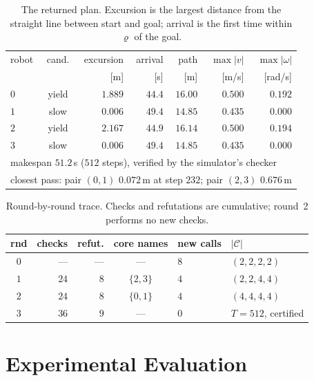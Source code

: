 \documentclass[conference]{IEEEtran}
\theoremstyle{plain}
\theoremstyle{definition}
\newcommand{\Cand}{\mathcal{C}}
\begin{document}
\begin{table}[t]
\caption{The returned plan. Excursion is the largest distance from the straight line between
start and goal; arrival is the first time within $\varrho$ of the goal.}
\label{tab:result}
\centering
\small
\setlength{\tabcolsep}{4pt}
\begin{tabular}{lcrrrrr}
\toprule
robot & cand. & excursion & arrival & path & $\max|v|$ & $\max|\omega|$ \\
      &       & [m] & [s] & [m] & [m/s] & [rad/s] \\
\midrule
$0$ & yield & $1.889$ & $44.4$ & $16.00$ & $0.500$ & $0.192$ \\
$1$ & slow  & $0.006$ & $49.4$ & $14.85$ & $0.435$ & $0.000$ \\
$2$ & yield & $2.167$ & $44.9$ & $16.14$ & $0.500$ & $0.194$ \\
$3$ & slow  & $0.006$ & $49.4$ & $14.85$ & $0.435$ & $0.000$ \\
\midrule
\multicolumn{7}{l}{makespan $51.2$\,s ($512$ steps), verified by the simulator's checker}\\
\multicolumn{7}{l}{closest pass: pair $(0,1)$ $0.072$\,m at step $232$; pair $(2,3)$ $0.676$\,m}\\
\bottomrule
\end{tabular}
\end{table}

\begin{table}[t]
\caption{Round-by-round trace. Checks and refutations are cumulative; round~2 performs no new
checks.}
\label{tab:rounds}
\centering
\small
\setlength{\tabcolsep}{4pt}
\begin{tabular}{crrcll}
\toprule
rnd & checks & refut. & core names & new calls & $|\Cand|$ \\
\midrule
$0$ & ---  & --- & ---       & $8$ & $(2,2,2,2)$ \\
$1$ & $24$ & $8$ & $\{2,3\}$ & $4$ & $(2,2,4,4)$ \\
$2$ & $24$ & $8$ & $\{0,1\}$ & $4$ & $(4,4,4,4)$ \\
$3$ & $36$ & $9$ & ---       & $0$ & $T = 512$, certified \\
\bottomrule
\end{tabular}
\end{table}

\section{Experimental Evaluation}
\label{sec:experiments}
\end{document}
